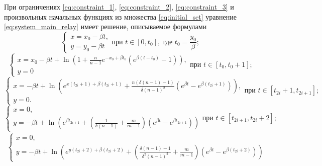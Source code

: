\begin{theorem}
	При ограничениях \eqref{eq:constraint_1}, \eqref{eq:constraint_2}, \eqref{eq:constraint_3}  и произвольных начальных функциях из множества \eqref{eq:initial_set} уравнение \eqref{eq:system_main_relay} имеет решение, описываемое формулами
	\begin{equation}
		\label{eq:step1_solution}
		\begin{cases}
			x = x_0 - \beta t,\\
			y = y_0 - \beta t
		\end{cases}
		\text{при } t \in [0, t_0], \text{ где } t_0 = \dfrac{y_0}{\beta};
	\end{equation}
	\begin{equation}
		\label{eq:step2_solution}
		\begin{cases}
			x = x_0 - \beta t + \ln\left(1 + \frac{n}{n - 1} e^{-x_0 + \beta t_0}  (e^{\beta  (t - t_0)} - 1)\right),\\
			y = 0
		\end{cases}
		\text{при } t \in [t_0, t_0 + 1];
	\end{equation}
	\begin{equation}
		\label{eq:step3_solution}
		\begin{cases}
			x = -\beta t + \ln\left(e^{x(t_{2i} + 1) + \beta (t_{2i} + 1)} + \frac{n (\delta(n - 1) - 1)}{\delta (n - 1)^2} (e^{\beta t} - e^{\beta (t_{2i} + 1)})\right)
			,\\
			y = 0.
		\end{cases}
		\text{при } t \in [t_{2i} + 1, t_{2i + 1}];
	\end{equation}
	\begin{equation}
		\label{eq:step4_solution}
		\begin{cases}
			x = 0,\\
			y = -\beta t + \ln\left(e^{\beta t_{2i + 1}} + \left(\frac{1}{\delta(n - 1)} + \frac{m}{m - 1}\right) (e^{\beta t} - e^{\beta t_{2i + 1}})\right)
		\end{cases}
		\text{при } t \in [t_{2i + 1}, t_{2i} + 2];
	\end{equation}
	\begin{multline}
		\label{eq:step5_solution}
		\begin{cases}
			x = 0,\\
			y = -\beta t + \ln\left(e^{y(t_{2i} + 2) + \beta (t_{2i} + 2)} + \left(\frac{\delta(n - 1) - 1}{\delta^2 (n - 1)^2} + \frac{m}{m - 1}\right) (e^{\beta t} - e^{\beta (t_{2i} + 2)})\right)

\end{cases}
\end{multline}
\end{theorem}
